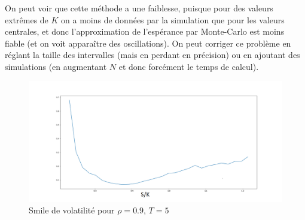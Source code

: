 \documentclass{report}
\begin{document}
On peut voir que cette méthode a une faiblesse, puisque pour des valeurs extrêmes de $K$ on a moins de données par la simulation que pour les valeurs centrales, et donc l'approximation de l'espérance par Monte-Carlo est moins fiable (et on voit apparaître des oscillations). On peut corriger ce problème en réglant la taille des intervalles (mais en perdant en précision) ou en ajoutant des simulations (en augmentant $N$ et donc forcément le temps de calcul).

\begin{figure}[H]
\begin{center}
\includegraphics[scale=0.3]{smile02.png}
\end{center}
\caption{Smile de volatilité pour $\rho = 0.9$, $T = 5$}
\end{figure} 
\newpage
\end{document}
